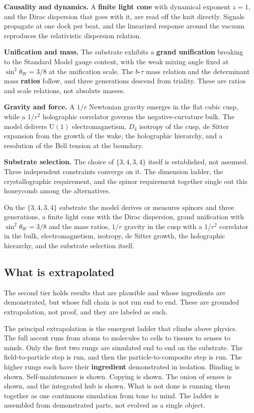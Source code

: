 \textbf{Causality and dynamics.} A \textbf{finite light cone} with dynamical exponent $z = 1$, and the Dirac dispersion that goes with it, are read off the knit directly. Signals propagate at one dock per beat, and the linearized response around the vacuum reproduces the relativistic dispersion relation.

\textbf{Unification and mass.} The substrate exhibits a \textbf{grand unification} breaking to the Standard Model gauge content, with the weak mixing angle fixed at $\sin^2\theta_W = 3/8$ at the unification scale. The $b$-$\tau$ mass relation and the determinant mass \textbf{ratios} follow, and three generations descend from triality. These are ratios and scale relations, not absolute masses.

\textbf{Gravity and force.} A $1/r$ Newtonian gravity emerges in the flat cubic cusp, while a $1/r^2$ holographic correlator governs the negative-curvature bulk. The model delivers $\mathrm{U}(1)$ electromagnetism, $D_4$ isotropy of the cusp, de Sitter expansion from the growth of the wake, the holographic hierarchy, and a resolution of the Bell tension at the boundary.

\textbf{Substrate selection.} The choice of $\{3,4,3,4\}$ itself is established, not assumed. Three independent constraints converge on it. The dimension ladder, the crystallographic requirement, and the spinor requirement together single out this honeycomb among the alternatives.

\begin{result}
On the $\{3,4,3,4\}$ substrate the model derives or measures spinors and three generations, a finite light cone with the Dirac dispersion, grand unification with $\sin^2\theta_W = 3/8$ and the mass ratios, $1/r$ gravity in the cusp with a $1/r^2$ correlator in the bulk, electromagnetism, isotropy, de Sitter growth, the holographic hierarchy, and the substrate selection itself.
\end{result}

\subsection{What is extrapolated}

The second tier holds results that are plausible and whose ingredients are demonstrated, but whose full chain is not run end to end. These are grounded extrapolation, not proof, and they are labeled as such.

The principal extrapolation is the emergent ladder that climbs above physics. The full ascent runs from atoms to molecules to cells to tissues to senses to minds. Only the first two rungs are simulated end to end on the substrate. The field-to-particle step is run, and then the particle-to-composite step is run. The higher rungs each have their \textbf{ingredient} demonstrated in isolation. Binding is shown. Self-maintenance is shown. Copying is shown. The onion of senses is shown, and the integrated hub is shown. What is not done is running them together as one continuous simulation from tone to mind. The ladder is assembled from demonstrated parts, not evolved as a single object.

